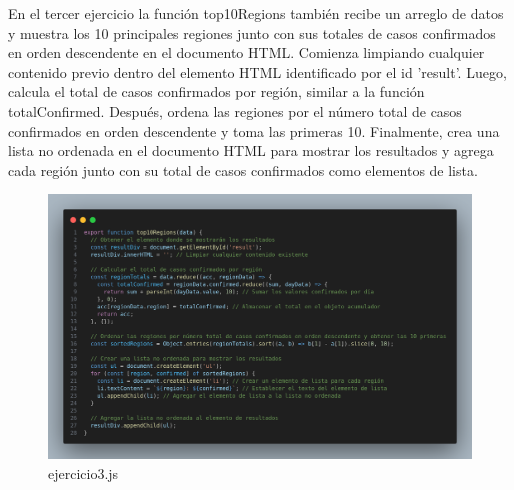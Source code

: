 En el tercer ejercicio la función top10Regions también recibe un arreglo de datos y muestra los 10 principales regiones junto con sus totales de casos confirmados en orden descendente en el documento HTML. Comienza limpiando cualquier contenido previo dentro del elemento HTML identificado por el id 'result'. Luego, calcula el total de casos confirmados por región, similar a la función totalConfirmed. Después, ordena las regiones por el número total de casos confirmados en orden descendente y toma las primeras 10. Finalmente, crea una lista no ordenada en el documento HTML para mostrar los resultados y agrega cada región junto con su total de casos confirmados como elementos de lista.

\begin{figure}[H]
  \centering
  \includegraphics[width=1.0\textwidth]{img/3_js.png}
  \caption{ejercicio3.js}
\end{figure}

